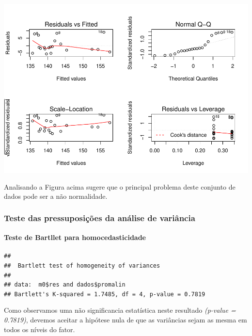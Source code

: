 \documentclass[
]{book}
\newenvironment{Shaded}{\begin{snugshade}}{\end{snugshade}}
\newcommand{\KeywordTok}[1]{\textcolor[rgb]{0.13,0.29,0.53}{\textbf{#1}}}
\newcommand{\NormalTok}[1]{#1}
\newcommand{\OperatorTok}[1]{\textcolor[rgb]{0.81,0.36,0.00}{\textbf{#1}}}
\begin{document}
\includegraphics{TudodoR_files/figure-latex/unnamed-chunk-288-1.pdf}

Analisando a Figura acima sugere que o principal problema deste conjunto de dados pode ser a não normalidade.

\hypertarget{teste-das-pressuposiuxe7uxf5es-da-anuxe1lise-de-variuxe2ncia}{%
\subsubsection{Teste das pressuposições da análise de variância}\label{teste-das-pressuposiuxe7uxf5es-da-anuxe1lise-de-variuxe2ncia}}

\hypertarget{teste-de-bartllet-para-homocedasticidade}{%
\paragraph{Teste de Bartllet para homocedasticidade}\label{teste-de-bartllet-para-homocedasticidade}}

\begin{Shaded}
\end{Shaded}

\begin{verbatim}
## 
##  Bartlett test of homogeneity of variances
## 
## data:  m0$res and dados$promalin
## Bartlett's K-squared = 1.7485, df = 4, p-value = 0.7819
\end{verbatim}

Como observamos uma não significancia estatística neste resultado \emph{(p-value = 0.7819)}, devemos aceitar a hipótese nula de que as variâncias sejam as mesma em todos os níveis do fator.
\end{document}
